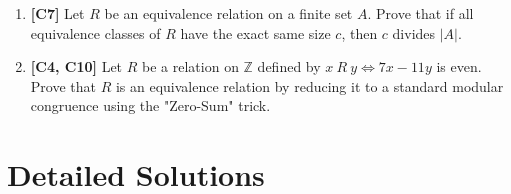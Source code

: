 \documentclass[11pt, a4paper]{article}
\theoremstyle{definition}
\theoremstyle{remark}
\newcommand{\Z}{\mathbb{Z}}
\begin{document}
\begin{enumerate}[label=\textbf{\arabic*.}, leftmargin=*]
    \item \textbf{[C7]} Let $R$ be an equivalence relation on a finite set $A$. Prove that if all equivalence classes of $R$ have the exact same size $c$, then $c$ divides $|A|$.
    
    \item \textbf{[C4, C10]} Let $R$ be a relation on $\Z$ defined by $x \ R \ y \iff 7x - 11y$ is even. Prove that $R$ is an equivalence relation by reducing it to a standard modular congruence using the "Zero-Sum" trick.
\end{enumerate}

\newpage

\section{Detailed Solutions}
\label{sec:solutions}
\end{document}
